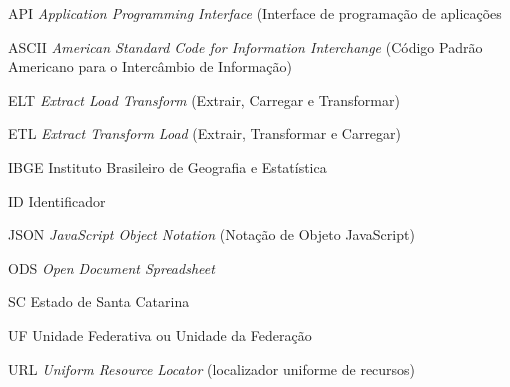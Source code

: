 \begin{siglas}
    \item[API] \textit{Application Programming Interface} (Interface de programação de aplicações
    \item[ASCII] \textit{American Standard Code for Information Interchange} (Código Padrão Americano para o Intercâmbio de Informação)
    \item[ELT] \textit{Extract Load Transform} (Extrair, Carregar e Transformar)
    \item[ETL] \textit{Extract Transform Load} (Extrair, Transformar e Carregar)
    \item[IBGE] Instituto Brasileiro de Geografia e Estatística
    \item[ID] Identificador
    \item[JSON] \textit{JavaScript Object Notation} (Notação de Objeto JavaScript)
    \item[ODS] \textit{Open Document Spreadsheet}
    \item[SC] Estado de Santa Catarina
    \item[UF] Unidade Federativa ou Unidade da Federação
    \item[URL] \textit{Uniform Resource Locator} (localizador uniforme de recursos)
  \end{siglas}
  
